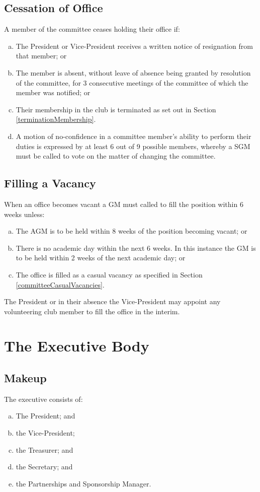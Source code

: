 \documentclass[11pt]{article}
\begin{document}
\subsection{Cessation of Office}
A member of the committee ceases holding their office if:
\begin{enumerate}[(a)]
    \item The President or Vice-President receives a written notice of resignation from that member; or
    \item The member is absent, without leave of absence being granted by resolution of the committee, for 3 consecutive meetings of the committee of which the member was notified; or
    \item Their membership in the club is terminated as set out in Section \ref{terminationMembership}.
    \item A motion of no-confidence in a committee member’s ability to perform their duties is expressed by at least 6 out of 9 possible members, whereby a SGM must be called to vote on the matter of changing the committee.
\end{enumerate}

\subsection{Filling a Vacancy}
When an office becomes vacant a GM must called to fill the position within 6 weeks unless:
\begin{enumerate}[(a)]
    \item The AGM is to be held within 8 weeks of the position becoming vacant; or
    \item There is no academic day within the next 6 weeks. In this instance the GM is to be held within 2 weeks of the next academic day; or
    \item The office is filled as a casual vacancy as specified in Section \ref{committeeCasualVacancies}.
\end{enumerate}
The President or in their absence the Vice-President may appoint any volunteering club member to fill the office in the interim.

\section{The Executive Body}

\subsection{Makeup}
The executive consists of:
\begin{enumerate}[(a)]
    \item The President; and
    \item the Vice-President;
    \item the Treasurer; and
    \item the Secretary; and
    \item the Partnerships and Sponsorship Manager.
\end{enumerate}
\end{document}
